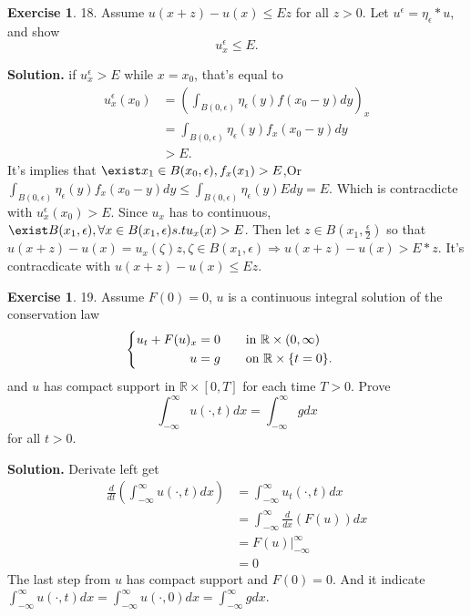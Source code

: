 \documentclass[a4paper]{book}
\newenvironment{solution}%
{\noindent\textbf{Solution.}}%
{\qedhere}
\numberwithin{equation}{chapter}
\theoremstyle{definition}
\newtheorem{exc}[exm]{Exercise}
\begin{document}
\begin{exc}
  18.  Assume $u(x + z) - u(x) \leq Ez$ for all $z > 0$. Let $u^{\epsilon} = \eta_\epsilon * u$, and show
  \[u_x^\epsilon \leq E.\]
\end{exc}

\begin{solution}
  if $u_x^\epsilon > E$ while $x = x_0$, that's equal to
  \begin{align*}
    u_x^\epsilon(x_0) &= (\int_{B(0,\epsilon)}\eta_\epsilon(y)f(x_0 -y)dy)_x \\
                      &= \int_{B(0,\epsilon)}\eta_\epsilon(y)f_x(x_0 -y)dy \\
    & > E.
  \end{align*}
  It's implies that $\exist x_1 \in B(x_0,\epsilon), f_x(x_1) > E$,Or $\int_{B(0,\epsilon)}\eta_\epsilon(y)f_x(x_0 -y)dy \leq \int_{B(0,\epsilon)}\eta_\epsilon(y)Edy = E$. Which is contracdicte with $u_x^\epsilon(x_0) > E$. Since $u_x$ has to continuous, $\exist B(x_1, \epsilon), \forall x \in B(x_1, \epsilon) s.t u_x(x) > E$. Then let $z \in B(x_1, \frac{\epsilon}{2})$ so that $u(x + z) - u(x) = u_x(\zeta) z, \zeta \in B(x_1, \epsilon) \Rightarrow u(x +z) - u(x) > E *z$. It's contracdicate with $u(x + z) - u(x) \leq Ez$.
\end{solution}


\begin{exc}
  19.  Assume $F(0) = 0$, $u$ is a continuous integral solution of the conservation law
  \begin{equation*}
    \begin{cases}
      \begin{aligned}
        u_t + F(u)_x = 0 \qquad &\textmd{in } \mathbb{R} \times (0, \infty) \\
        u = g \qquad &\textmd{on } \mathbb{R} \times \{t = 0\}.
      \end{aligned}
    \end{cases}
  \end{equation*}
  and $u$ has compact support in $\mathbb{R} \times [0, T]$ for each time $T > 0$. Prove
  \[\int_{-\infty}^{\infty} u(\cdot,t)dx = \int_{-\infty}^{\infty}g dx\]
  for all $t > 0$.
\end{exc}

\begin{solution}
  Derivate left get
  \begin{align*}
    \frac{d}{dt}(\int_{-\infty}^{\infty}u(\cdot,t)dx) &= \int_{-\infty}^{\infty}u_t(\cdot,t)dx \\
                                                      &= \int_{-\infty}^{\infty}\frac{d}{dx}(F(u))dx \\
                                                      &= \left. F(u) \right|_{-\infty}^\infty \\
                                                      &= 0
  \end{align*}
  The last step from $u$ has compact support and $F(0) = 0$. And it indicate $\int_{-\infty}^{\infty} u(\cdot,t)dx = \int_{-\infty}^{\infty} u(\cdot,0)dx = \int_{-\infty}^{\infty} gdx$.
\end{solution}
\end{document}
